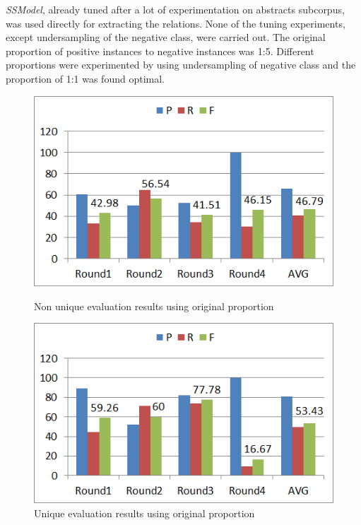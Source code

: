 \textit{SSModel}, already tuned after a lot of experimentation on abstracts subcorpus, was used directly for extracting the relations. None of the tuning experiments, except undersampling \cite{akbani2004applying} of the negative class, were carried out. The original proportion of positive instances to negative instances was 1:5. Different proportions were experimented by using undersampling of negative class and the proportion of 1:1 was found optimal.

\begin{figure}
\centering
\begin{minipage}{.5\textwidth}
  \centering
  \includegraphics[width=.95\textwidth]{figures/3_FTOrigRatioResults.png}
  \caption{Non unique evaluation results using original proportion}
  \label{fig:FT_ResOrigNonUniq}
\end{minipage}%
\begin{minipage}{.5\textwidth}
  \centering
  \includegraphics[width=.95\textwidth]{figures/3_FTOrigRatioResults_Uniq.png}
  \caption{Unique evaluation results using original proportion}
  \label{fig:FT_ResOrigUniq}
\end{minipage}
\end{figure}

